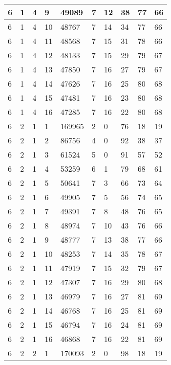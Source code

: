 \begin{table}[!ht]
\begin{tabular}{|l|l|l|l|l|l|l|l|l|l|}
        6 & 1 & 4 & 9 & 49089 & 7 & 12 & 38 & 77 & 66 \\ \hline
        6 & 1 & 4 & 10 & 48767 & 7 & 14 & 34 & 77 & 66 \\ \hline
        6 & 1 & 4 & 11 & 48568 & 7 & 15 & 31 & 78 & 66 \\ \hline
        6 & 1 & 4 & 12 & 48133 & 7 & 15 & 29 & 79 & 67 \\ \hline
        6 & 1 & 4 & 13 & 47850 & 7 & 16 & 27 & 79 & 67 \\ \hline
        6 & 1 & 4 & 14 & 47626 & 7 & 16 & 25 & 80 & 68 \\ \hline
        6 & 1 & 4 & 15 & 47481 & 7 & 16 & 23 & 80 & 68 \\ \hline
        6 & 1 & 4 & 16 & 47285 & 7 & 16 & 22 & 80 & 68 \\ \hline
        6 & 2 & 1 & 1 & 169965 & 2 & 0 & 76 & 18 & 19 \\ \hline
        6 & 2 & 1 & 2 & 86756 & 4 & 0 & 92 & 38 & 37 \\ \hline
        6 & 2 & 1 & 3 & 61524 & 5 & 0 & 91 & 57 & 52 \\ \hline
        6 & 2 & 1 & 4 & 53259 & 6 & 1 & 79 & 68 & 61 \\ \hline
        6 & 2 & 1 & 5 & 50641 & 7 & 3 & 66 & 73 & 64 \\ \hline
        6 & 2 & 1 & 6 & 49905 & 7 & 5 & 56 & 74 & 65 \\ \hline
        6 & 2 & 1 & 7 & 49391 & 7 & 8 & 48 & 76 & 65 \\ \hline
        6 & 2 & 1 & 8 & 48974 & 7 & 10 & 43 & 76 & 66 \\ \hline
        6 & 2 & 1 & 9 & 48777 & 7 & 13 & 38 & 77 & 66 \\ \hline
        6 & 2 & 1 & 10 & 48253 & 7 & 14 & 35 & 78 & 67 \\ \hline
        6 & 2 & 1 & 11 & 47919 & 7 & 15 & 32 & 79 & 67 \\ \hline
        6 & 2 & 1 & 12 & 47307 & 7 & 16 & 29 & 80 & 68 \\ \hline
        6 & 2 & 1 & 13 & 46979 & 7 & 16 & 27 & 81 & 69 \\ \hline
        6 & 2 & 1 & 14 & 46768 & 7 & 16 & 25 & 81 & 69 \\ \hline
        6 & 2 & 1 & 15 & 46794 & 7 & 16 & 24 & 81 & 69 \\ \hline
        6 & 2 & 1 & 16 & 46868 & 7 & 16 & 22 & 81 & 69 \\ \hline
        6 & 2 & 2 & 1 & 170093 & 2 & 0 & 98 & 18 & 19 \\ \hline

\end{tabular}
\end{table}
